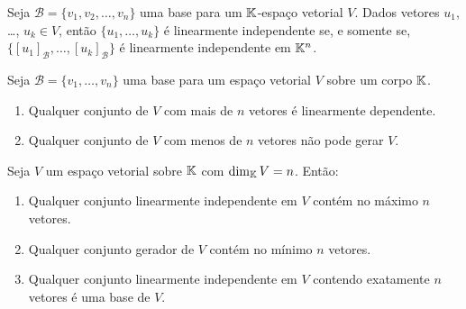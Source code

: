 \documentclass{beamer}
\begin{document}
\begin{frame}
  \begin{teorema}
    Seja $\mathcal{B} = \{v_1, v_2, \dots, v_n\}$ uma base  para um $\mathbb{K}$-espaço vetorial $V$.  Dados vetores $u_1$, \dots, $u_k \in V$,  então $\{u_1, \dots, u_k\}$ é linearmente independente  se, e somente se,  $\{[u_1]_\mathcal{B}, \dots, [u_k]_\mathcal{B}\}$  é linearmente independente em $\mathbb{K}^n$.
  \end{teorema}
\end{frame}

\begin{frame}
  \begin{teorema}
    Seja $\mathcal{B} = \{v_1, \dots, v_n\}$ uma base  para um espaço vetorial $V$ sobre um corpo $\mathbb{K}$.
    \begin{enumerate}[label={\roman*})]
      \vspace{.2cm}

      \item Qualquer conjunto  de $V$ com mais de $n$ vetores  é linearmente dependente.

      \vspace{1cm}

      \item Qualquer conjunto de $V$ com menos de $n$ vetores  não pode gerar $V$.
    \end{enumerate}
  \end{teorema}
\end{frame}


\begin{frame}
  \begin{teorema}
    Seja $V$ um espaço vetorial sobre $\mathbb{K}$  com $\dim_{\mathbb{K}} V = n$.  Então:
    \begin{enumerate}[label={\roman*})]
      \vspace{.2cm}

      \item Qualquer conjunto linearmente independente em $V$  contém no máximo $n$ vetores.

      \vspace{1cm}

      \item Qualquer conjunto gerador de $V$  contém no mínimo $n$ vetores.

      \vspace{1cm}

      \item Qualquer conjunto linearmente independente em $V$  contendo exatamente $n$ vetores  é uma base de $V$.

      \seti

     \end{enumerate}
  \end{teorema}
\end{frame}
\end{document}
